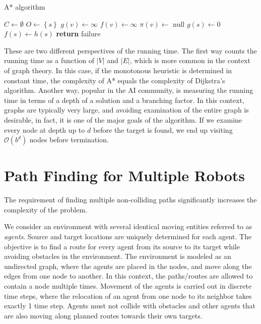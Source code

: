 \begin{algorithm}
\DontPrintSemicolon
\SetAlgoLined
\caption{A* algorithm}
\BlankLine
{}
\BlankLine
	$C\leftarrow\emptyset$ 
	$O\leftarrow\left\{s\right\}$  
 {
	$g(v)\leftarrow\infty$\;
	$f(v)\leftarrow\infty$\;
	$\pi(v)\leftarrow \text{ null}$ 
}
$g(s)\leftarrow 0$\;
$f(s)\leftarrow h(s)$\;
\textbf{return } failure
\label{alg:astar}
\end{algorithm}

These are two different perspectives of the running time. 
The first way counts the running time as a function of $|V|$ and $|E|$, which is more common in the context of graph theory.
In this case, if the monotonous heuristic is determined in constant time, the complexity of A* equals the complexity of Dijkstra's algorithm. 
Another way, popular in the AI community, is measuring the running time in terms of a depth of a solution and a branching factor.
In this context, graphs are typically very large, and avoiding examination of the entire graph is desirable, in fact, it is one of the major goals of the algorithm.
If we examine every node at depth up to $d$ before the target is found, we end up visiting $\mathcal{O}(b^d)$ nodes before termination.

\section{Path Finding for Multiple Robots}\label{sec:lrastar}

The requirement of finding multiple non-colliding paths significantly increases the complexity of the problem.

We consider an environment with several identical moving entities referred to as \emph{agents}. 
Source and target locations are uniquely determined for each agent. 
The objective is to find a route for every agent from its source to its target while avoiding obstacles in the environment.
The environment is modeled as an undirected graph, where the agents are placed in the nodes, and move along the edges from one node to another. 
In this context, the paths/routes are allowed to contain a node multiple times.
Movement of the agents is carried out in discrete time steps, where the relocation of an agent from one node to its neighbor takes exactly 1 time step.
Agents must not collide with obstacles and other agents that are also moving along planned routes towards their own targets.

